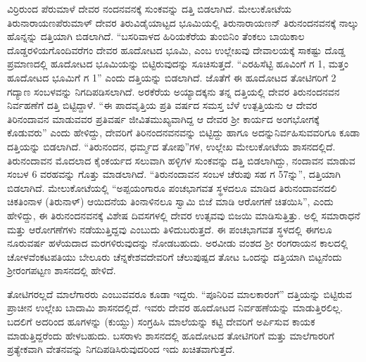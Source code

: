 ವಿರ್ರಿರುಂದ ಪೆರುಮಾಳೆ ದೇವರ ನಂದನವನಕ್ಕೆ ಸುಂಕವನ್ನು ದತ್ತಿ ಬಿಡಲಾಗಿದೆ. ಮೇಲುಕೋಟೆಯ ತಿರುನಾರಾಯಣಪೆರುಮಾಳ್​ ದೇವರ ತಿರುವಿಡೈಯಾಟ್ಟದ ಭೂಮಿಯಲ್ಲಿ ತಿರುನಾರಾಯಣನ್​ ತಿರುನಂದನವನಕ್ಕೆ ನಾಲ್ಕು ಹೊನ್ನನ್ನು ದತ್ತಿಯಾಗಿ ಬಿಡಲಾಗಿದೆ. “ಬಸರಿವಾಳದ ಹಿರಿಯಕೆರೆಯ ತುಂಬಿನಿಂ ತೆಂಕಲು ಬಾಯಿಕಾಲ ದೊಡ್ಡರಳಿಯಗೊಂದಿವರೆಗಂ ದೇವರ ಹೂದೋಟದ ಭೂಮಿ, ಎಂಬ ಉಲ್ಲೇಖವು ದೇವಾಲಯಕ್ಕೆ ಸಾಕಷ್ಟು ದೊಡ್ಡ ಪ್ರಮಾಣದಲ್ಲಿ ಹೂದೋಟದ ಭೂಮಿಯನ್ನು ಬಿಟ್ಟಿರುವುದನ್ನು ಸೂಚಿಸುತ್ತದೆ. “ಎರಹಿಸೆಟ್ಟಿ ಹೂವಿಂಗೆ ಗ 1, ಮತ್ತಂ ಹೂದೋಟದ ಭೂಮಿಗೆ ಗ 1” ಎಂದು ದತ್ತಿಯನ್ನು ಬಿಡಲಾಗಿದೆ. ಜೊತೆಗೆ ಈ ಹೂದೋಟದ ತೋಟಿಗರಿಗೆ 2 ಗದ್ಯಾಣ ಸಂಬಳವನ್ನು ನಿಗದಿಪಡಿಸಲಾಗಿದೆ. ಅರಕೆರೆಯ ಅಯ್ಯಾದಕ್ಕನು ತನ್ನ ದತ್ತಿಯಲ್ಲಿ ದೇವರ ತಿರುನಂದನವನ ನಿರ್ವಹಣೆಗೆ ದತ್ತಿ ಬಿಟ್ಟಿದ್ದಾಳೆ. “ಈ ಪಾದವೃತ್ತಿಯ ಪ್ರತಿ ವರ್ಷದ ಸಮಸ್ತ ಬೆಳೆ ಉತ್ಪತ್ತಿಯನು ಆ ದೇವರ ತಿರಿನಂದಾವನ ಮಾಡುವವರ ಪ್ರತಿವರ್ಷ ಜೀವಿತಮುಖ್ಯವಾಗಿದ್ದ ಆ ದೇವರ ಶ‍್ರೀ ಕಾರ್ಯದ ಅಂಗಭೋಗಕ್ಕೆ ಕೊಡುವರು” ಎಂದು ಹೇಳಿದ್ದು, ದೇವರಿಗೆ ತಿರಿನಂದನವನವನ್ನು ಬಿಟ್ಟಿದ್ದು ಹಾಗೂ ಅದನ್ನು\break ನಿರ್ವಹಿಸುವವರಿಗೂ ಕೂಡಾ ದತ್ತಿಯನ್ನು ಬಿಡಲಾಗಿದೆ. “ತಿರುನಂದನ, ಧರ್ಮ್ಮದ ತೋಪು”ಗಳ, ಉಲ್ಲೇಖ ಮೇಲುಕೋಟೆಯ ಶಾಸನದಲ್ಲಿದೆ. ತಿರುನಂದಾವನ ಮೊದಲಾದ ಕೈಂಕರ್ಯದ ಸಲುವಾಗಿ ಹಳ್ಳಿಗಳ ಸುಂಕವನ್ನು ದತ್ತಿ ಬಿಡಲಾಗಿದ್ದು, ನಂದಾವನ ಮಾಡುವ ಸಂಬಳ 6 ವರಹವನ್ನು ಗೊತ್ತು ಮಾಡಲಾಗಿದೆ. “ತಿರುನಂದಾವನ ಸಂಬಳ ಚೆರುಪು ಸಹ ಗ 57ನ್ನು”, ದತ್ತಿಯಾಗಿ ಬಿಡಲಾಗಿದೆ. ಮೇಲುಕೋಟೆಯಲ್ಲಿ “ಅಪ್ಪಯಂಗಾರೂ ಪಂಚಭಾಗವತ ಸ್ಥಳದಲೂ ಮಾಡಿದ ತಿರುನಂದಾವನದಲಿ ಚಿಕತಿಂನಾಳ (ತಿರುನಾಳ್) ಆಯಿದನೆಯ ತಿಂನಾಳಿನಲೂ ಸ್ವಾಮಿ ಬಿಜೆ ಮಾಡಿ ಆರೋಗಣೆ ಚಿತಯಿಸಿ”, ಎಂದು ಹೇಳಿದ್ದು, ಈ ತಿರುನಂದನವನಕ್ಕೆ ವಿಶೇಷ ದಿವಸಗಳಲ್ಲಿ ದೇವರ ಉತ್ಸವವು ಬಿಜಯಿ ಮಾಡಿಸುತ್ತಿತ್ತು. ಅಲ್ಲಿ ಸಮಾರಾಧನೆ ಮತ್ತು ಆರೋಗಣೆಗಳು ನಡೆಯುತ್ತಿದ್ದವು ಎಂಬುದು ತಿಳಿದುಬರುತ್ತದೆ. ಈ ಪಂಚಭಾಗವತ ಸ್ಥಳದಲ್ಲಿ ಈಗಲೂ ನೂರುವರ್ಷ ಹಳೆಯದಾದ ಮರಗಳಿರುವುದನ್ನು ನೋಡಬಹುದು. ಅರವೀಡು ವಂಶದ ಶ‍್ರೀ ರಂಗರಾಯನ ಕಾಲದಲ್ಲಿ ಚೋಳವೆಂಕಟಪತಿಯು ಬೇಲೂರು ಚೆನ್ನಕೇಶವ\-ದೇವರಿಗೆ ಚೆಲುಪುಷ್ಪದ ತೋಟ ಒಂದನ್ನು ದತ್ತಿಯಾಗಿ ಬಿಟ್ಟನೆಂದು ಶ‍್ರೀರಂಗಪಟ್ಟಣ ಶಾಸನದಲ್ಲಿ ಹೇಳಿದೆ.

ತೋಟಿಗರಲ್ಲದೆ ಮಾಲೆಗಾರರು ಎಂಬುವವರೂ ಕೂಡಾ ಇದ್ದರು. “ಪೂನಿರಿವ ಮಾಲಕಾರಂಗೆ” ದತ್ತಿಯನ್ನು ಬಿಟ್ಟಿರುವ ಪ್ರಾಚೀನ ಉಲ್ಲೇಖ ಬಾದಾಮಿ ಶಾಸನದಲ್ಲಿದೆ. ಇವರು ದೇವರ ಹೂದೋಟದ ನಿರ್ವಹಣೆಯನ್ನು ಮಾಡುತ್ತಿರಲಿಲ್ಲ. ಬದಲಿಗೆ ಅದರಿಂದ ಹೂಗಳನ್ನು (ಕುಯ್ದು) ಸಂಗ್ರಹಿಸಿ ಮಾಲೆಯನ್ನು ಕಟ್ಟಿ ದೇವರಿಗೆ ಅರ್ಪಿಸುವ ಕಾಯಕ ಮಾಡುತ್ತಿದ್ದರೆಂದು ಹೇಳಬಹುದು. ಬಸರಾಳು ಶಾಸನದಲ್ಲಿ ಹೂದೋಟದ ತೋಟಿಗರಿಗೆ ಮತ್ತು ಮಾಲೆಗಾರರಿಗೆ ಪ್ರತ್ಯೇಕವಾಗಿ ವೇತನವನ್ನು ನಿಗದಿಪಡಿಸಿರುವುದರಿಂದ ಇದು ಖಚಿತವಾಗುತ್ತದೆ.

